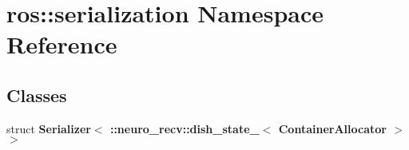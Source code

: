 \section{ros\-:\-:serialization \-Namespace \-Reference}
\label{namespaceros_1_1serialization}
\subsection*{\-Classes}
\begin{DoxyCompactItemize}
\item 
struct {\bf \-Serializer$<$ \-::neuro\-\_\-recv\-::dish\-\_\-state\-\_\-$<$ Container\-Allocator $>$ $>$}
\end{DoxyCompactItemize}
